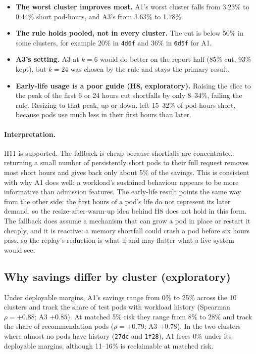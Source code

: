 \begin{itemize}
  \item \textbf{The worst cluster improves most.} A1's worst cluster falls from 3.23\% to 0.44\% short pod-hours, and A3's from 3.63\% to 1.78\%.
  \item \textbf{The rule holds pooled, not in every cluster.} The cut is below 50\% in some clusters, for example 20\% in \texttt{4d6f} and 36\% in \texttt{6d5f} for A1.
  \item \textbf{A3's setting.} A3 at $k=6$ would do better on the report half (85\% cut, 93\% kept), but $k=24$ was chosen by the rule and stays the primary result.
  \item \textbf{Early-life usage is a poor guide (H8, exploratory).} Raising the slice to the peak of the first 6 or 24 hours cut shortfalls by only 8--34\%, failing the rule. Resizing to that peak, up or down, left 15--32\% of pod-hours short, because pods use much less in their first hours than later.
\end{itemize}

\paragraph{Interpretation.} H11 is supported. The fallback is cheap because shortfalls are concentrated: returning a small number of persistently short pods to their full request removes most short hours and gives back only about 5\% of the savings. This is consistent with why A1 does well: a workload's sustained behaviour appears to be more informative than admission features. The early-life result points the same way from the other side: the first hours of a pod's life do not represent its later demand, so the resize-after-warm-up idea behind H8 does not hold in this form. The fallback does assume a mechanism that can grow a pod in place or restart it cheaply, and it is reactive: a memory shortfall could crash a pod before six hours pass, so the replay's reduction is what-if and may flatter what a live system would see.

\subsection{Why savings differ by cluster (exploratory)}
\label{sec:clusterdrivers}

Under deployable margins, A1's savings range from 0\% to 25\% across the 10 clusters and track the share of test pods with workload history (Spearman $\rho = +0.88$; A3 $+0.85$). At matched 5\% risk they range from 8\% to 28\% and track the share of recommendation pods ($\rho = +0.79$; A3 $+0.78$). In the two clusters where almost no pods have history (\texttt{27dc} and \texttt{1f28}), A1 frees 0\% under its deployable margins, although 11--16\% is reclaimable at matched risk.

